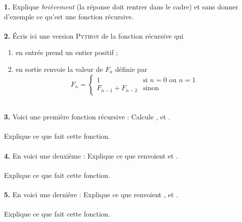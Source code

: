 \documentclass[a4paper,11pt]{article}
\begin{document}


\textbf{1. }Explique \textit{brièvement} (la réponse doit rentrer dans le cadre) et sans donner d'exemple ce qu'est une fonction récursive.\\

\\

\textbf{2. }\'Ecris ici une version \textsc{Python} de la fonction récursive  qui
\begin{enumerate}[--]
	\item 	en entrée prend un entier positif ;
	\item 	en sortie renvoie la valeur de $F_n$ définie par $$F_n=\begin{cases}
		1 & \mbox{si } n=0\mbox{ ou }n=1\\
		F_{n-1}+F_{n-2} &\mbox{sinon}
	\end{cases}$$
\end{enumerate}

\\
\newpage
\textbf{3. }Voici une première fonction récursive :
Calcule ,  et .\\

\\

Explique ce que fait cette fonction.\\

\\
\newpage
\textbf{4.} En voici une deuxième :
Explique ce que renvoient  et .\\

\\

Explique ce que fait cette fonction.\\

\\




\newpage
\textbf{5.} En voici une dernière :
Explique ce que renvoient ,   et .\\

\\

Explique ce que fait cette fonction.\\

\\
\end{document}
